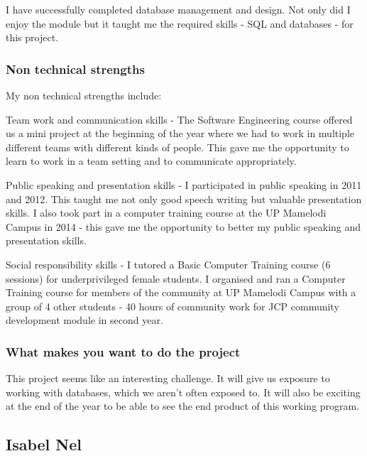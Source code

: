 \documentclass[hidelinks, 12pt, oneside]{article}
\begin{document}
I have successfully completed database management and design. Not only did I enjoy the module but it taught me the required skills - SQL and databases - for this project. 

\subsubsection{Non technical strengths}

My non technical strengths include: 

Team work and communication skills - The Software Engineering course offered us a mini project at the beginning of the year where we had to work in multiple different teams with different kinds of people. This gave me the opportunity to learn to work in a team setting and to communicate appropriately.
 
Public speaking and presentation skills - I participated in public speaking in 2011 and 2012. This taught me not only good speech writing but valuable presentation skills.
I also took part in a computer training course at the UP Mamelodi Campus in 2014 - this gave me the opportunity to better my public speaking and presentation skills.

Social responsibility skills - I tutored a Basic Computer Training course (6 sessions) for underprivileged female students.
I organised and ran a Computer Training course for members of the community at UP Mamelodi Campus with a group of 4 other students - 40 hours of community work for JCP community development module in second year.

\subsubsection{What makes you want to do the project}

This project seems like an interesting challenge. It will give us exposure to working with databases, which we aren't often exposed to. It will also be exciting at the end of the year to be able to see the end product of this working program.

\subsection{Isabel Nel}
\end{document}
